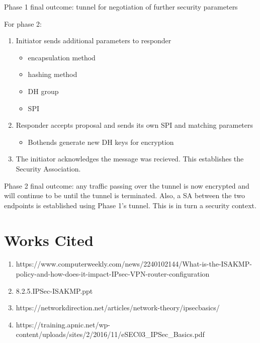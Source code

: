 \documentclass{report}
\newcommand{\squash}{\itemsep=0pt\parskip=0pt}
\begin{document}
Phase 1 final outcome: tunnel for negotiation of further security parameters

For phase 2:
\begin{enumerate}
  \item Initiator sends additional parameters to responder
    \begin{itemize}
      \squash
    \item encapsulation method
    \item hashing method
    \item DH group
    \item SPI
    \end{itemize}
  \item Responder accepts proposal and sends its own SPI and matching parameters
    \begin{itemize}
    \item Bothends generate new DH keys for encryption
    \end{itemize}
  \item The initiator acknowledges the message was recieved. This establishes the Security Association.
\end{enumerate}

Phase 2 final outcome: any traffic passing over the tunnel is now encrypted and will continue to be until the tunnel is terminated. Also, a SA between the two endpoints is established using Phase 1's tunnel. This is in turn a security context. 

\chapter {Works Cited}

\begin{enumerate}
\item https://www.computerweekly.com/news/2240102144/What-is-the-ISAKMP-policy-and-how-does-it-impact-IPsec-VPN-router-configuration
\item 8.2.5.IPSec-ISAKMP.ppt
\item https://networkdirection.net/articles/network-theory/ipsecbasics/
\item https://training.apnic.net/wp-content/uploads/sites/2/2016/11/eSEC03_IPSec_Basics.pdf
\end{enumerate}
 
\end{document}
